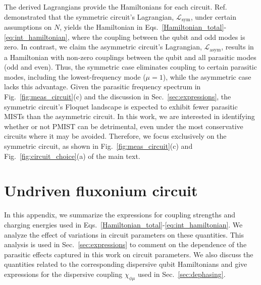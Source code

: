 \documentclass[%
reprint,
superscriptaddress,
 amsmath,amssymb,
 aps,
 prx,
longbibliography,
floatfix,
]{revtex4-2}
\begin{document}
The derived Lagrangians provide the Hamiltonians for each circuit. Ref.~\cite{viola2015collective} demonstrated that the symmetric circuit's Lagrangian, \( \mathcal{L}_\textrm{sym} \), under certain assumptions on \( N \), yields the Hamiltonian in Eqs.~\ref{Hamiltonian_total}-\ref{eq:int_hamiltonian}, where the coupling between the qubit and odd modes is zero. In contrast, we claim the asymmetric circuit's Lagrangian, \( \mathcal{L}_\textrm{asym} \), results in a Hamiltonian with non-zero couplings between the qubit and all parasitic modes (odd and even). Thus, the symmetric case eliminates coupling to certain parasitic modes, including the lowest-frequency mode (\( \mu = 1 \)), while the asymmetric case lacks this advantage. Given the parasitic frequency spectrum in Fig.~\ref{fig:meas_circuit}(c) and the discussion in Sec.~\ref{sec:expressions}, the symmetric circuit's Floquet landscape is expected to exhibit fewer parasitic MISTs than the asymmetric circuit. In this work, we are interested in identifying whether or not PMIST can be detrimental, even under the most conservative circuits where it may be avoided. Therefore, we focus exclusively on the symmetric circuit, as shown in Fig.~\ref{fig:meas_circuit}(c) and Fig.~\ref{fig:circuit_choice}(a) of the main text.

\section{Undriven fluxonium circuit}\label{app:Hamiltonian}
In this appendix, we summarize the expressions for coupling strengths and charging energies used in Eqs.~\ref{Hamiltonian_total}-\ref{eq:int_hamiltonian}. We analyze the effect of variations in circuit parameters on these quantities. This analysis is used in Sec.~\ref{sec:expressions} to comment on the dependence of the parasitic effects captured in this work on circuit parameters. We also discuss the quantities related to the corresponding dispersive qubit Hamiltonians and give expressions for the dispersive coupling $\chi_{\phi\mu}$ used in Sec.~\ref{sec:dephasing}.
\end{document}
